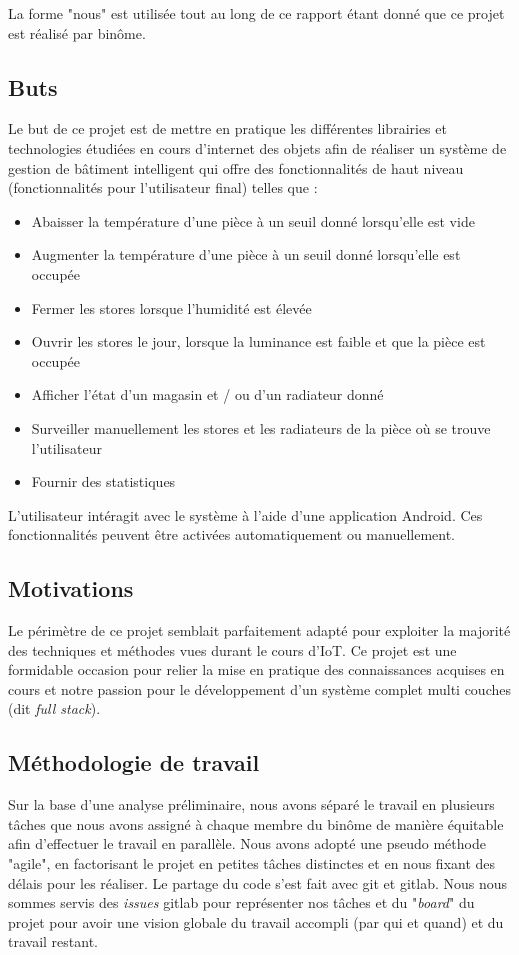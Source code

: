 La forme "nous" est utilisée tout au long de ce rapport étant donné que ce projet est réalisé par binôme.

\subsection{Buts}
Le but de ce projet est de mettre en pratique les différentes librairies et technologies étudiées en cours d'internet des objets afin de réaliser un système de gestion de bâtiment intelligent qui offre des fonctionnalités de haut niveau (fonctionnalités pour l'utilisateur final) telles que :
\begin{itemize}
    \item Abaisser la température d'une pièce à un seuil donné lorsqu'elle est vide
    \item Augmenter la température d'une pièce à un seuil donné lorsqu'elle est occupée
    \item Fermer les stores lorsque l'humidité est élevée
    \item Ouvrir les stores le jour, lorsque la luminance est faible et que la pièce est occupée
    \item Afficher l'état d'un magasin et / ou d'un radiateur donné
    \item Surveiller manuellement les stores et les radiateurs de la pièce où se trouve l'utilisateur
    \item Fournir des statistiques
\end{itemize}
L'utilisateur intéragit avec le système à l'aide d'une application Android. Ces fonctionnalités peuvent être activées automatiquement ou manuellement.

\subsection{Motivations}
Le périmètre de ce projet semblait parfaitement adapté pour exploiter la majorité des techniques et méthodes vues durant le cours d'IoT. Ce projet est une formidable occasion pour relier la mise en pratique des connaissances acquises en cours et notre passion pour le développement d'un système complet multi couches (dit \textit{full stack}).

\subsection{Méthodologie de travail}
Sur la base d'une analyse préliminaire, nous avons séparé le travail en plusieurs tâches que nous avons assigné à chaque membre du binôme de manière équitable afin d'effectuer le travail en parallèle.
Nous avons adopté une pseudo méthode "agile", en factorisant le projet en petites tâches distinctes et en nous fixant des délais pour les réaliser. Le partage du code s'est fait avec git et gitlab. Nous nous sommes servis des \textit{issues} gitlab pour représenter nos tâches et du "\textit{board}" du projet pour avoir une vision globale du travail accompli (par qui et quand) et du travail restant.
